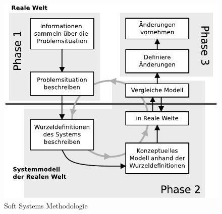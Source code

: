\documentclass[11pt,a4paper]{report}
\begin{document}
\begin{figure}[htbp]
\centering
\includegraphics[scale=0.9]{images/ssm.pdf}
\caption{Soft Systems Methodologie}
\label{fig:ssm}
\end{figure}
\end{document}
